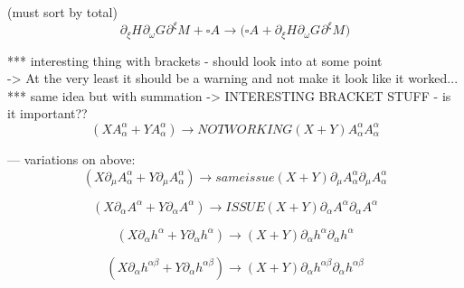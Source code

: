 \documentclass{article}
\def\){\Big)}
\def\({\Big(}
\begin{document}
(must sort by total)\\
\begin{equation}
 \partial_{\xi}H^{}\partial_{\omega}G^{}\partial^{\xi}M^{} + \square A^{} \rightarrow 
\( \square A^{} + \partial_{\xi}H^{} \partial_{\omega}G^{} \partial^{\xi}M^{} \)
\end{equation}

*** interesting thing with brackets - should look into at some point\\
-> At the very least it should be a warning and not make it look like it worked...\\


*** same idea but with summation -> INTERESTING BRACKET STUFF - is it important??\\

{\color{red}
\begin{equation}
(X A^{\alpha}_{\alpha} + Y A^{\alpha}_{\alpha}) \rightarrow NOT WORKING
(X + Y ) A_{\alpha}^{\alpha} A_{\alpha}^{\alpha}
\end{equation}
}

— variations on above:
{\color{red}
\begin{equation}
(X \partial_{\mu}A^{\alpha}_{\alpha} + Y \partial_{\mu} A^{\alpha}_{\alpha}) \rightarrow same issue
(X + Y ) \partial_{\mu}A_{\alpha}^{\alpha} \partial_{\mu}A_{\alpha}^{\alpha}
\end{equation}
}

{\color{red}
\begin{equation} 
(X \partial_{\alpha}A^{\alpha} + Y \partial_{\alpha} A^{\alpha}) \rightarrow ISSUE
(X + Y ) \partial_{\alpha}A^{\alpha} \partial_{\alpha}A^{\alpha}
\end{equation}
}

\begin{equation}
(X \partial_{\alpha}h^{\alpha} + Y \partial_{\alpha} h^{\alpha}) \rightarrow (X + Y ) \partial_{\alpha}h^{\alpha} \partial_{\alpha}h^{\alpha}
\end{equation}


\begin{equation}
(X \partial_{\alpha}h^{\alpha \beta} + Y \partial_{\alpha} h^{\alpha \beta}) \rightarrow
(X + Y ) \partial_{\alpha}h^{\alpha \beta} \partial_{\alpha}h^{\alpha \beta}
\end{equation}
\end{document}
